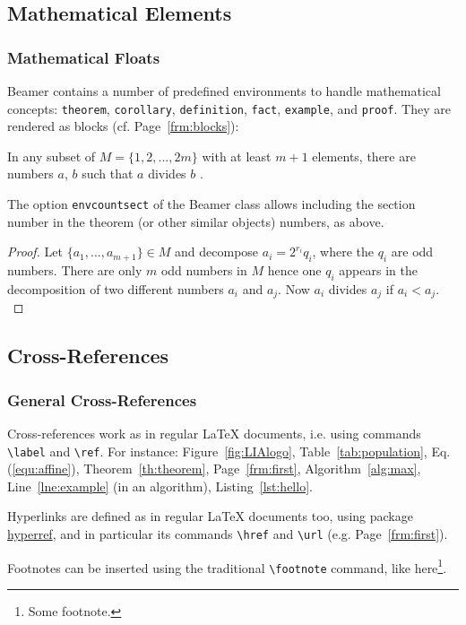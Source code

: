 \documentclass[10pt,    %
    english,            %
    xcolor=table,       %
    envcountsect,        %
    aspectratio=169     %
]{beamer}
\begin{document}
\subsection{Mathematical Elements}
\begin{frame}
    \frametitle{Mathematical Floats}
    
    Beamer contains a number of predefined environments to handle mathematical concepts: \texttt{theorem}, \texttt{corollary}, \texttt{definition}, \texttt{fact}, \texttt{example}, and \texttt{proof}. They are rendered as blocks (cf. Page~\ref{frm:blocks}):
    
    \begin{theorem}
        In any subset of $M = \{1, 2, ... , 2m\}$ with at least $m + 1$ elements, there are numbers $a$, $b$ such that $a$ divides $b$ \cite{Neunhauserer2013}.
        \label{th:theorem}
    \end{theorem} 
    
    The option \texttt{envcountsect} of the Beamer class allows including the section number in the theorem (or other similar objects) numbers, as above.
    
    \begin{proof}
         Let $\{a_1, . . . , a_{m+1}\} \in M$ and decompose $a_i = 2^{r_i} q_i$, where the $q_i$ are odd numbers. There are only $m$ odd numbers in $M$ hence one $q_i$ appears in the decomposition of two different numbers $a_i$ and $a_j$. Now $a_i$ divides $a_j$ if $a_i < a_j$.
        \label{th:proof}
    \end{proof} 
\end{frame}
    




\subsection{Cross-References}
\begin{frame}
    \frametitle{General Cross-References}
    
    Cross-references work as in regular \LaTeX{} documents, i.e. using commands \texttt{\textbackslash{}label} and \texttt{\textbackslash{}ref}. For instance: Figure~\ref{fig:LIAlogo}, Table~\ref{tab:population}, Eq.(\ref{equ:affine}), Theorem~\ref{th:theorem}, Page~\ref{frm:first}, Algorithm~\ref{alg:max}, Line~\ref{lne:example} (in an algorithm), Listing~\ref{lst:hello}.
    
    \vspace{0.25cm}
    Hyperlinks are defined as in regular \LaTeX{} documents too, using package \href{https://ctan.org/pkg/hyperref?lang=en}{hyperref}, and in particular its commands \texttt{\textbackslash{}href} and \texttt{\textbackslash{}url} (e.g. Page~\ref{frm:first}).

    \vspace{0.25cm}
    Footnotes can be inserted using the traditional \texttt{\textbackslash{}footnote} command, like here\footnote{Some footnote.}.
\end{frame}
\end{document}
